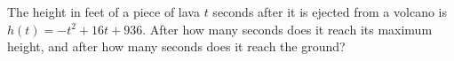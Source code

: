 The height in feet of a piece of lava $t$ seconds after it is ejected from a volcano is $h(t)=-t^2+16t+936$. After how many seconds does it reach its maximum height, and after how many seconds does it reach the ground?
